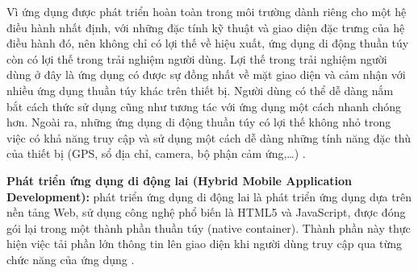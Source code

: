 \documentclass[12pt,a4paper,oneside]{extbook}
\begin{document}
Vì ứng dụng được phát triển hoàn toàn trong môi trường dành riêng cho một hệ điều hành nhất định, với những đặc tính kỹ thuật và giao diện đặc trưng của hệ điều hành đó, nên không chỉ có lợi thế về hiệu xuất, ứng dụng di động thuần túy còn có lợi thế trong trải nghiệm người dùng. Lợi thế trong trải nghiệm người dùng ở đây là ứng dụng có được sự đồng nhất về mặt giao diện và cảm nhận với nhiều ứng dụng thuần túy khác trên thiết bị. Người dùng có thể dễ dàng nắm bắt cách thức sử dụng cũng như tương tác với ứng dụng một cách nhanh chóng hơn. Ngoài ra, những ứng dụng di động thuần túy có lợi thế không nhỏ trong việc có khả năng truy cập và sử dụng một cách dễ dàng những tính năng đặc thù của thiết bị (GPS, sổ địa chỉ, camera, bộ phận cảm ứng,\dots) \cite{hybrid-vs-native}.

\textbf{Phát triển ứng dụng di động lai (Hybrid Mobile Application Development):} phát triển ứng dụng di động lai là phát triển ứng dụng dựa trên nền tảng Web, sử dụng công nghệ phổ biến là HTML5 và JavaScript, được đóng gói lại trong một thành phần thuần túy (native container). Thành phần này thực hiện việc tải phần lớn thông tin lên giao diện khi người dùng truy cập qua từng chức năng của ứng dụng \cite{hybrid-vs-native}.
\end{document}
